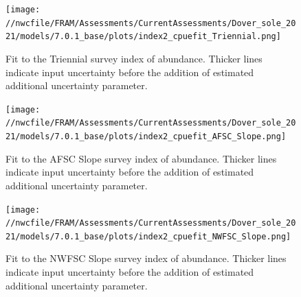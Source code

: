 \documentclass[11pt,
  english,
  a4paper,
]{article}
\begin{document}
\tagmcend\tagstructend


\begin{figure}
\centering
\texttt{[image: //nwcfile/FRAM/Assessments/CurrentAssessments/Dover\_sole\_2021/models/7.0.1\_base/plots/index2\_cpuefit\_Triennial.png]}
\caption{Fit to the Triennial survey index of abundance. Thicker lines indicate input uncertainty before the addition of estimated additional uncertainty parameter.\label{fig:tri-index-fit}}
\end{figure}

\tagmcend\tagstructend


\begin{figure}
\centering
\texttt{[image: //nwcfile/FRAM/Assessments/CurrentAssessments/Dover\_sole\_2021/models/7.0.1\_base/plots/index2\_cpuefit\_AFSC\_Slope.png]}
\caption{Fit to the AFSC Slope survey index of abundance. Thicker lines indicate input uncertainty before the addition of estimated additional uncertainty parameter.\label{fig:afsc-index-fit}}
\end{figure}

\tagmcend\tagstructend


\begin{figure}
\centering
\texttt{[image: //nwcfile/FRAM/Assessments/CurrentAssessments/Dover\_sole\_2021/models/7.0.1\_base/plots/index2\_cpuefit\_NWFSC\_Slope.png]}
\caption{Fit to the NWFSC Slope survey index of abundance. Thicker lines indicate input uncertainty before the addition of estimated additional uncertainty parameter.\label{fig:nwslope-index-fit}}
\end{figure}

\tagmcend\tagstructend

\end{document}
